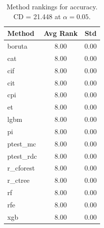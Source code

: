 \begin{table}[h]
\centering
\caption{Method rankings for accuracy. CD = 21.448 at $\alpha=0.05$.}
\label{tab:ranks_accuracy}
\begin{tabular}{lcc}
\toprule
Method & Avg Rank & Std \\
\midrule
boruta & 8.00 & 0.00 \\
cat & 8.00 & 0.00 \\
cif & 8.00 & 0.00 \\
cit & 8.00 & 0.00 \\
cpi & 8.00 & 0.00 \\
et & 8.00 & 0.00 \\
lgbm & 8.00 & 0.00 \\
pi & 8.00 & 0.00 \\
ptest_mc & 8.00 & 0.00 \\
ptest_rdc & 8.00 & 0.00 \\
r_cforest & 8.00 & 0.00 \\
r_ctree & 8.00 & 0.00 \\
rf & 8.00 & 0.00 \\
rfe & 8.00 & 0.00 \\
xgb & 8.00 & 0.00 \\
\bottomrule
\end{tabular}
\end{table}